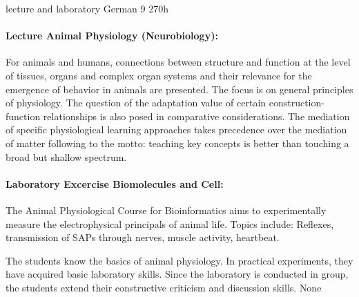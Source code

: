 {lecture and laboratory}
{German}
{9}
{270h}
{\paragraph{Lecture Animal Physiology (Neurobiology):} For animals and humans, connections between structure and function at the level of tissues, organs and complex organ systems and their relevance for the emergence of behavior in animals are presented. The focus is on general principles of physiology. The question of the adaptation value of certain construction-function relationships is also posed in comparative considerations. The mediation of specific physiological learning approaches takes precedence over the mediation of matter following to the motto: teaching key concepts is better than touching a broad but shallow spectrum.
\paragraph{Laboratory Excercise Biomolecules and Cell:}  The Animal Physiological Course for Bioinformatics aims to experimentally measure the electrophysical principals of animal life. Topics include: Reflexes, transmission of SAPs through nerves, muscle activity, heartbeat. }
{The students know the basics of animal physiology. In practical experiments, they have acquired basic laboratory skills. Since the laboratory is conducted in group, the students extend their constructive criticism and discussion skills.}
{None}